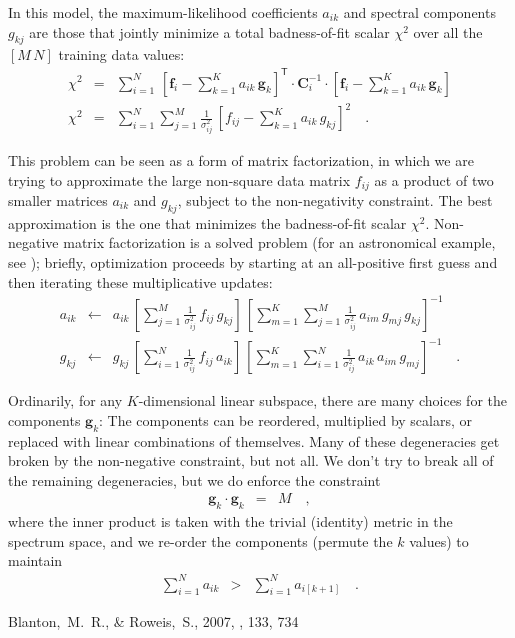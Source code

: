 \documentclass[preprint]{aastex}
\newcommand{\mmatrix}[1]{\boldsymbol{#1}}
\newcommand{\inverse}[1]{{#1}^{-1}}
\newcommand{\transpose}[1]{{#1}^{\mathsf{T}}}
\newcommand{\covar}{\mmatrix{C}}
\newcommand{\fvec}{\mmatrix{f}}
\newcommand{\gvec}{\mmatrix{g}}
\newcommand{\invvar}{\inverse{\covar}}
\begin{document}
In this model, the maximum-likelihood coefficients $a_{ik}$ and
spectral components $g_{kj}$ are those that jointly minimize a total
badness-of-fit scalar $\chi^2$ over all the $[M\,N]$ training data
values:
\begin{eqnarray}\displaystyle
\chi^2 &=& \sum_{i=1}^N 
 \,\transpose{\left[\fvec_i - \sum_{k=1}^K a_{ik}\,\gvec_k\right]}
 \cdot\invvar_i\cdot\left[\fvec_i - \sum_{k=1}^K a_{ik}\,\gvec_k\right]
 \nonumber\\
\chi^2 &=& \sum_{i=1}^N \sum_{j=1}^M \frac{1}{\sigma_{ij}^2}
 \,\left[f_{ij} - \sum_{k=1}^K a_{ik}\,g_{kj}\right]^2
\quad .
\end{eqnarray}

This problem can be seen as a form of matrix factorization, in which
we are trying to approximate the large non-square data matrix $f_{ij}$
as a product of two smaller matrices $a_{ik}$ and $g_{kj}$, subject to
the non-negativity constraint.  The best approximation is the one that
minimizes the badness-of-fit scalar $\chi^2$.  Non-negative matrix
factorization is a solved problem (for an astronomical example, see
\citealt{kcorrect}); briefly, optimization proceeds by starting
at an all-positive first guess and then iterating these multiplicative
updates:
\begin{eqnarray}\displaystyle
a_{ik} &\leftarrow& a_{ik}
 \,\left[\sum_{j=1}^M\frac{1}{\sigma_{ij}^2}\,f_{ij}\,g_{kj}\right]
 \,\left[\sum_{m=1}^K\sum_{j=1}^M\frac{1}{\sigma_{ij}^2}\,a_{im}\,g_{mj}\,g_{kj}\right]^{-1}
\nonumber\\
g_{kj} &\leftarrow& g_{kj}
 \,\left[\sum_{i=1}^N\frac{1}{\sigma_{ij}^2}\,f_{ij}\,a_{ik}\right]
 \,\left[\sum_{m=1}^K\sum_{i=1}^N\frac{1}{\sigma_{ij}^2}\,a_{ik}\,a_{im}\,g_{mj}\right]^{-1}
\quad .
\end{eqnarray}

Ordinarily, for any $K$-dimensional linear subspace, there are many
choices for the components $\gvec_k$: The components can be reordered,
multiplied by scalars, or replaced with linear combinations of
themselves.  Many of these degeneracies get broken by the non-negative
constraint, but not all.  We don't try to break all of the remaining
degeneracies, but we do enforce the constraint
\begin{eqnarray}\displaystyle
\gvec_k\cdot\gvec_k &=& M
\quad,
\end{eqnarray}
where the inner product is taken with the trivial (identity) metric in
the spectrum space, and we re-order the components (permute the $k$
values) to maintain
\begin{eqnarray}\displaystyle
\sum_{i=1}^N a_{ik} &>& \sum_{i=1}^N a_{i[k+1]}
\quad.
\end{eqnarray}

\begin{thebibliography}{70}
Blanton,~M.~R., \& Roweis,~S., 2007, \aj, 133, 734 
\end{thebibliography}
\end{document}
